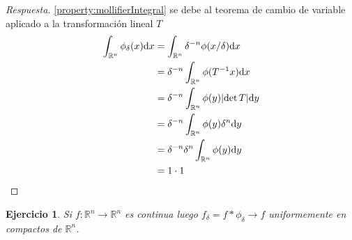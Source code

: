 \documentclass{article}
\newcommand{\realNumbers}{\mathbb{R}}
\newtheorem{exercise}{Ejercicio}
\theoremstyle{remark}
\begin{document}
\begin{proof}[Respuesta]
  \ref{property:mollifierIntegral}
  se debe al teorema de cambio de variable aplicado a la transformación lineal \(T\)
  \begin{align}
    \int_{\realNumbers^n} \phi_{\delta}(x) \dd x
    &=
    \int_{\realNumbers^n} \delta^{- n} \phi(x / \delta) \dd x
    \\
    &=
    \delta^{- n}
    \int_{\realNumbers^n}\phi(T^{- 1} x) \dd x
    \\
    &=
    \delta^{- n}
    \int_{\realNumbers^n}\phi(y) \abs{\det T} \dd y
    \\
    &=
    \delta^{- n}
    \int_{\realNumbers^n}\phi(y) \delta^n \dd y
    \\
    &=
    \delta^{- n} \delta^n 
    \int_{\realNumbers^n}\phi(y) \dd y
    \\
    &=
    1 
    \cdot 1
  \end{align}
\end{proof}

\begin{exercise}
  \label{exercise:convolutionCompactUniformConvergence}
  Si \(f : \realNumbers^n \rightarrow \realNumbers^n\) es continua luego \(f_{\delta} = f * \phi_{\delta} \rightarrow f\) uniformemente en compactos de \(\realNumbers^n\).
\end{exercise}
\end{document}
